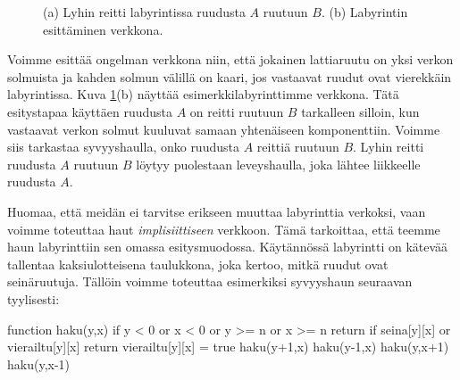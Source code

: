 \begin{figure}
\center
\begin{center}
\end{center}
\caption{(a) Lyhin reitti labyrintissa ruudusta $A$ ruutuun $B$. (b)
Labyrintin esittäminen verkkona.}
\label{fig:labrei}
\end{figure}

Voimme esittää ongelman verkkona niin,
että jokainen lattiaruutu on yksi verkon solmuista
ja kahden solmun välillä on kaari,
jos vastaavat ruudut ovat vierekkäin labyrintissa.
Kuva \ref{fig:labrei}(b) näyttää esimerkkilabyrinttimme verkkona.
Tätä esitystapaa käyttäen ruudusta $A$ on reitti ruutuun $B$ tarkalleen silloin,
kun vastaavat verkon solmut kuuluvat samaan yhtenäiseen komponenttiin.
Voimme siis tarkastaa syvyyshaulla, onko ruudusta $A$ reittiä ruutuun $B$.
Lyhin reitti ruudusta $A$ ruutuun $B$ löytyy
puolestaan leveyshaulla, joka lähtee liikkeelle ruudusta $A$.

Huomaa, että meidän ei tarvitse erikseen muuttaa labyrinttia
verkoksi, vaan voimme toteuttaa haut \emph{implisiittiseen} verkkoon.
Tämä tarkoittaa, että teemme haun labyrinttiin sen omassa
esitysmuodossa. Käytännössä labyrintti on kätevää tallentaa kaksiulotteisena
taulukkona, joka kertoo, mitkä ruudut ovat seinäruutuja.
Tällöin voimme toteuttaa esimerkiksi syvyyshaun seuraavan tyylisesti:

\begin{code}
function haku(y,x)
    if y < 0 or x < 0 or y >= n or x >= n
        return
    if seina[y][x] or vierailtu[y][x]
        return
    vierailtu[y][x] = true
    haku(y+1,x)
    haku(y-1,x)
    haku(y,x+1)
    haku(y,x-1)
\end{code}